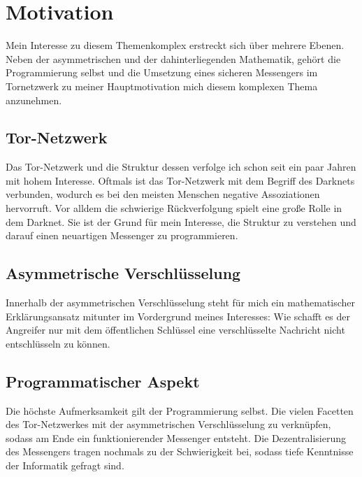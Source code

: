 \documentclass[a4paper,ngerman, headheight=28pt,12pt]{scrartcl}
\newcommand{\vcite}[1]{\cite[vgl.][]{#1}}
\begin{document}

\tableofcontents
\setcounter{page}{0}
\thispagestyle{empty}
\vspace{0.5cm}
\pagebreak

\linenumbers
\modulolinenumbers[5]

\section{Motivation}
Mein Interesse zu diesem Themenkomplex erstreckt sich über mehrere Ebenen. Neben der asymmetrischen und der dahinterliegenden Mathematik, gehört die Programmierung selbst und die Umsetzung eines sicheren Messengers im Tornetzwerk zu meiner Hauptmotivation mich diesem komplexen Thema anzunehmen.
\subsection{Tor-Netzwerk}
Das Tor-Netzwerk und die Struktur dessen verfolge ich schon seit ein paar Jahren mit hohem Interesse. Oftmals ist das Tor-Netzwerk mit dem Begriff des Darknets verbunden, wodurch es bei den meisten Menschen negative Assoziationen hervorruft. Vor alldem die schwierige Rückverfolgung spielt eine große Rolle in dem Darknet. Sie ist der Grund für mein Interesse, die Struktur zu verstehen und darauf einen neuartigen Messenger zu programmieren\vcite{texbook}.

\subsection{Asymmetrische Verschlüsselung}
Innerhalb der asymmetrischen Verschlüsselung steht für mich ein mathematischer Erklärungsansatz mitunter im Vordergrund meines Interesses: \glqq Wie schafft es der Angreifer nur mit dem öffentlichen Schlüssel eine verschlüsselte Nachricht nicht entschlüsseln zu können\grqq.

\subsection{Programmatischer Aspekt}
Die höchste Aufmerksamkeit gilt der Programmierung selbst. Die vielen Facetten des Tor-Netzwerkes mit der asymmetrischen Verschlüsselung zu verknüpfen, sodass am Ende ein funktionierender Messenger entsteht. Die Dezentralisierung des Messengers tragen nochmals zu der Schwierigkeit bei, sodass tiefe Kenntnisse der Informatik gefragt sind.
\end{document}
